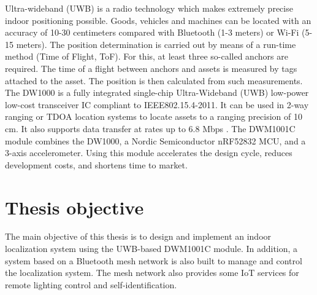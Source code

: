 \documentclass[\main/main.tex]{subfiles}
\begin{document}
Ultra-wideband (UWB) is a radio technology which makes extremely precise indoor positioning possible. Goods, vehicles and machines can be located with an accuracy of 10-30 centimeters compared with Bluetooth (1-3 meters) or Wi-Fi (5-15 meters). The position determination is carried out by means of a run-time method (Time of Flight, ToF). For this, at least three so-called anchors are required. The time of a flight between anchors and assets is measured by tags attached to the asset. The position is then calculated from such measurements.
\newline\newline
The DW1000 is a fully integrated single-chip Ultra-Wideband (UWB) low-power low-cost transceiver IC compliant to IEEE802.15.4-2011. It can be used in 2-way ranging or TDOA location systems to locate assets to a ranging precision of 10 cm. It also supports data transfer at rates up to 6.8 Mbps \cite{decawave:dw1000_datasheet}.
\newline\newline
The DWM1001C module combines the DW1000, a Nordic Semiconductor nRF52832 MCU, and a 3-axis accelerometer. Using this module accelerates the design cycle, reduces development costs, and shortens time to market.

\section{Thesis objective}
The main objective of this thesis is to design and implement an indoor localization system using the UWB-based DWM1001C module. In addition, a system based on a Bluetooth mesh network is also built to manage and control the localization system. The mesh network also provides some IoT services for remote lighting control and self-identification.

\end{document}
